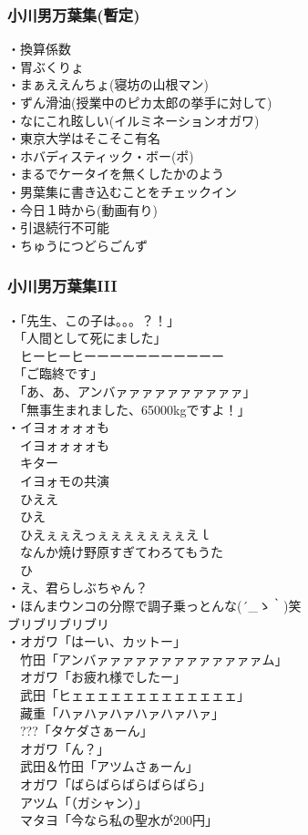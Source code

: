 \subsubsection{小川男万葉集(暫定)}
・換算係数 \\
・胃ぶくりょ\\ 
・まぁええんちょ(寝坊の山根マン)\\
・ずん滑油(授業中のピカ太郎の挙手に対して)\\
・なにこれ眩しい(イルミネーションオガワ) \\
・東京大学はそこそこ有名\\
・ホバディスティック・ボー(ポ)\\
・まるでケータイを無くしたかのよう\\
・男葉集に書き込むことをチェックイン\\
・今日１時から(動画有り)\\
・引退続行不可能\\
・ちゅうにつどらごんず\\

\newpage
\subsubsection{小川男万葉集III}
・「先生、この子は。。。？！」\\
　「人間として死にました」\\
　ヒーヒーヒーーーーーーーーーーー\\
　「ご臨終です」\\
　「あ、あ、アンバァァァァァァァァァァ」\\
　「無事生まれました、65000kgですよ！」\\
・イヨォォォォも\\
　イヨォォォォも\\
　キター\\
　イヨォモの共演\\
　ひええ\\
　ひえ\\
　ひえぇぇえっぇぇぇぇぇぇぇえｌ\\
　なんか焼け野原すぎてわろてもうた\\
　ひ\\
・え、君らしぶちゃん？\\
・ほんまウンコの分際で調子乗っとんな{\sf (´\_ゝ｀)}笑\\
    ブリブリブリブリ\\
・オガワ「はーい、カットー」\\
　竹田「アンバァァァァァァァァァァァァァム」\\
　オガワ「お疲れ様でしたー」\\
　武田「ヒェェェェェェェェェェェェェ」\\
　藏重「ハァハァハァハァハァハァ」\\
　???「タケダさぁーん」\\
　オガワ「ん？」\\
　武田＆竹田「アツムさぁーん」\\
　オガワ「ばらばらばらばらばら」\\
　アツム「（ガシャン）」\\
　マタヨ「今なら私の聖水が200円」\\


